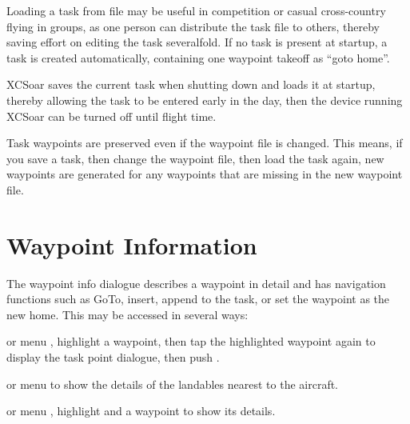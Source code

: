Loading a task from file may be useful in competition or casual
cross-country flying in groups, as one person can distribute the task
file to others, thereby saving effort on editing the task severalfold.
\tip{}
If no task is present at startup, a task is created automatically,
containing one waypoint takeoff as ``goto home''.

XCSoar saves the current task when shutting down and loads it at
startup, thereby allowing the task to be entered early in the day,
then the device running XCSoar can be turned off until flight time.

Task waypoints are preserved even if the waypoint
file is changed.  This means, if you save a task, then change the
waypoint file, then load the task again, new waypoints are generated
for any waypoints that are missing in the new waypoint file.

\section{Waypoint Information}

The waypoint info dialogue describes a waypoint in detail and has
navigation functions such as GoTo, insert, append to the task, or set the
waypoint as the new home.
This may be accessed in several ways:

or menu \blink{},
highlight a waypoint, then tap the highlighted waypoint again to display the
task point dialogue, then push .

or menu \blink{}
to show the
details of the landables nearest to the aircraft.

or menu \blink{}
, highlight and  a waypoint to show its details.


